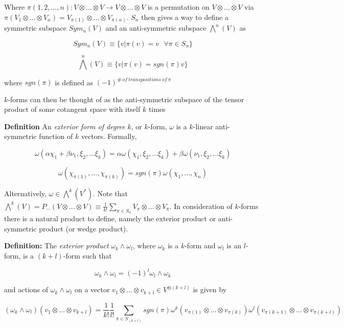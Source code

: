 \documentclass{article}\usepackage[]{graphicx}\usepackage[]{color}
\begin{document}
Where $\pi (1,2,...,n):V\otimes ... \otimes V \rightarrow V\otimes ... \otimes V$ is a permutation on $V\otimes ... \otimes V$ via $\pi (V_1\otimes ... \otimes V_n )=V_{\pi (1)}\otimes ... \otimes V_{\pi (n)}$. $S_n$ then gives a way to define a symmetric subspace $Sym_n(V)$ and an anti-symmetric subspace $\bigwedge^n(V)$ as

$$
Sym_n (V) \equiv \lbrace v \vert \pi (v)=v \ \ \ \forall \pi \in S_n\rbrace
$$

$$
\bigwedge^n(V)\equiv \lbrace v\vert \pi (v)= sgn(\pi ) v\rbrace
$$
 
 \begin{center}
 where $sgn(\pi)$ is defined as $(-1)^{\# \ of \ transpositions \ of \ \pi}$  
\end{center}  
 
$k$-forms can then be thought of as the anti-symmetric subspace of the tensor product of some cotangent space with itself $k$ times
 
 
 \textbf{Definition} An \textit{exterior form of degree} $k$, or $k$-form, $\omega$  is a $k$-linear anti-symmetric function of $k$ vectors. Formally,
 
 $$
 \omega (\alpha \chi_1 + \beta \nu_1,\xi_2,...\xi_k )=\alpha \omega (\chi_1,\xi_2,...\xi_k )+\beta \omega (\nu_1,\xi_2,...\xi_k )
 $$
 
\begin{center}

\end{center} 
 
$$
\omega(\chi_{\pi(1)},...,\chi_{\pi(k)})=sgn(\pi) \omega(\chi_1,...,\chi_n)
$$ 
 
Alternatively, $\omega\in\bigwedge^k(V^*)$. Note that $\bigwedge^k(V)=P_-(V\otimes...\otimes V)\equiv \frac{1}{k!}\sum_{\pi\in S_n}V_{\pi}\otimes ... \otimes V_{\pi}$. In consideration of $k$-forms there is a natural product to define, namely the exterior product or anti-symmetric product 
 (or wedge product).
 
\textbf{Definition:} The \textit{exterior product} $\omega_k\wedge \omega_l$, where $\omega_k$ is a $k$-form and $\omega_l$ is an $l$-form, is a $(k+l)$-form such that 

$$
\omega_k\wedge\omega_l=(-1)^l \omega_l\wedge\omega_k
$$
 
and actions of $\omega_k\wedge \omega_l$ on a vector $v_1\otimes ... \otimes v_{k+l}\in V^{\otimes(k+l)}$ is given by 

$$
(\omega_k\wedge \omega_l)(v_1\otimes ... \otimes v_{k+l})=\frac{1}{k!}\frac{1}{l!}\sum_
{\pi\in S_{(k+l)}}sgn(\pi )\omega^k(v_{\pi(1)}\otimes ... \otimes v_{\pi(k)})\omega^l(v_{\pi(k+1)}\otimes ... \otimes v_{\pi(k+l)})
$$  
 
\end{document}
